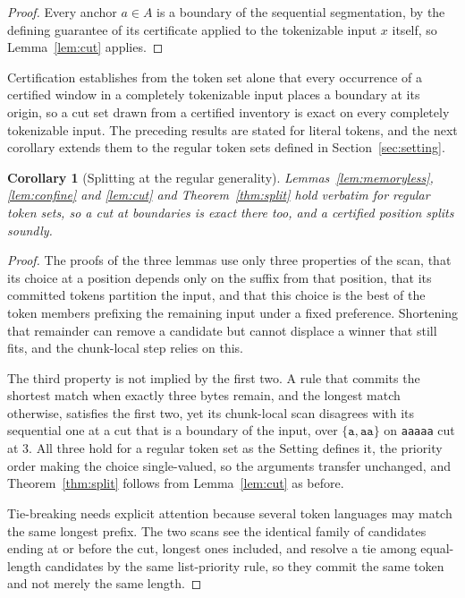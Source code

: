 \documentclass[11pt,a4paper]{article}
\theoremstyle{definition}
\theoremstyle{plain}
\newtheorem{corollary}{Corollary}
\newcommand{\code}[1]{\texttt{#1}}
\begin{document}
\begin{proof}
Every anchor $a \in A$ is a boundary of the sequential segmentation, by the defining guarantee of its certificate
applied to the tokenizable input $x$ itself, so Lemma~\ref{lem:cut} applies.
\end{proof}

Certification establishes from the token set alone that every occurrence of a certified window in a completely
tokenizable input places a boundary at its origin, so a cut set drawn from a certified inventory is exact on every
completely tokenizable input. The preceding results are stated for literal tokens, and the next corollary extends them
to the regular token sets defined in Section~\ref{sec:setting}.


\begin{corollary}[Splitting at the regular generality]\label{cor:splitregular}
Lemmas~\ref{lem:memoryless}, \ref{lem:confine} and \ref{lem:cut} and Theorem~\ref{thm:split} hold verbatim for regular
token sets, so a cut at boundaries is exact there too, and a certified position splits soundly.
\end{corollary}

\begin{proof}
The proofs of the three lemmas use only three properties of the scan, that its choice at a position depends only on the
suffix from that position, that its committed tokens partition the input, and that this choice is the best of the token
members prefixing the remaining input under a fixed preference. Shortening that remainder can remove a candidate but
cannot displace a winner that still fits, and the chunk-local step relies on this.

The third property is not implied by the first two. A rule that commits the shortest match when exactly three bytes
remain, and the longest match otherwise, satisfies the first two, yet its chunk-local scan disagrees with its sequential
one at a cut that is a boundary of the input, over $\{\code{a}, \code{aa}\}$ on \code{aaaaa} cut at $3$. All three hold
for a regular token set as the Setting defines it, the priority order making the choice single-valued, so the arguments
transfer unchanged, and Theorem~\ref{thm:split} follows from Lemma~\ref{lem:cut} as before.

Tie-breaking needs explicit attention because several token languages may match the same longest prefix. The two scans
see the identical family of candidates ending at or before the cut, longest ones included, and resolve a tie among
equal-length candidates by the same list-priority rule, so they commit the same token and not merely the same length.
\end{proof}
\end{document}
